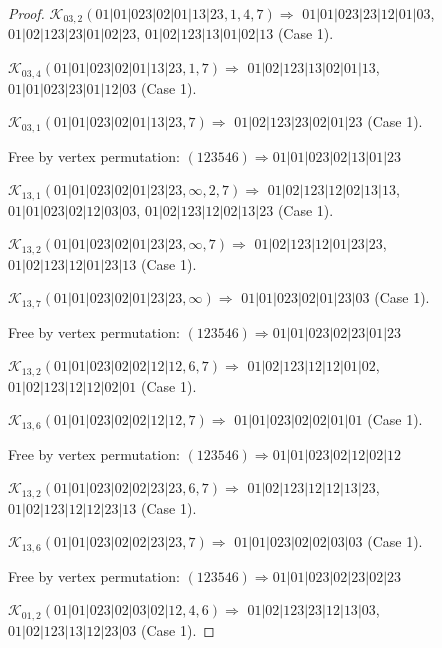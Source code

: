 \documentclass[12pt]{article}
\theoremstyle{plain}
\theoremstyle{definition}
\theoremstyle{remark}
\newcommand{\fancy}[1]{\mathcal{#1}}
\def\K{\fancy{K}}
\begin{document}
\begin{proof}
	$\K_{03,2}(01|01|023|02|01|13|23,1, 4, 7)\Rightarrow $ $01|01|023|23|12|01|03$, $01|02|123|23|01|02|23$, $01|02|123|13|01|02|13$ (Case 1).
	
	$\K_{03,4}(01|01|023|02|01|13|23,1, 7)\Rightarrow $ $01|02|123|13|02|01|13$, $01|01|023|23|01|12|03$ (Case 1).
	
	$\K_{03,1}(01|01|023|02|01|13|23,7)\Rightarrow $ $01|02|123|23|02|01|23$ (Case 1).
	
	
	
	Free by vertex permutation: $(1 2 3 5 4 6)\Rightarrow 01|01|023|02|13|01|23$
	
	
	
	\bigskip
	
	$\K_{13,1}(01|01|023|02|01|23|23,\infty,2, 7)\Rightarrow $ $01|02|123|12|02|13|13$, $01|01|023|02|12|03|03$, $01|02|123|12|02|13|23$ (Case 1).
	
	$\K_{13,2}(01|01|023|02|01|23|23,\infty,7)\Rightarrow $ $01|02|123|12|01|23|23$, $01|02|123|12|01|23|13$ (Case 1).
	
	$\K_{13,7}(01|01|023|02|01|23|23,\infty)\Rightarrow $ $01|01|023|02|01|23|03$ (Case 1).
	
	
	
	Free by vertex permutation: $(1 2 3 5 4 6)\Rightarrow 01|01|023|02|23|01|23$
	
	
	
	\bigskip
	
	$\K_{13,2}(01|01|023|02|02|12|12,6, 7)\Rightarrow $ $01|02|123|12|12|01|02$, $01|02|123|12|12|02|01$ (Case 1).
	
	$\K_{13,6}(01|01|023|02|02|12|12,7)\Rightarrow $ $01|01|023|02|02|01|01$ (Case 1).
	
	
	
	Free by vertex permutation: $(1 2 3 5 4 6)\Rightarrow 01|01|023|02|12|02|12$
	
	
	
	\bigskip
	
	$\K_{13,2}(01|01|023|02|02|23|23,6, 7)\Rightarrow $ $01|02|123|12|12|13|23$, $01|02|123|12|12|23|13$ (Case 1).
	
	$\K_{13,6}(01|01|023|02|02|23|23,7)\Rightarrow $ $01|01|023|02|02|03|03$ (Case 1).
	
	
	
	Free by vertex permutation: $(1 2 3 5 4 6)\Rightarrow 01|01|023|02|23|02|23$
	
	
	
	\bigskip
	
	$\K_{01,2}(01|01|023|02|03|02|12,4, 6)\Rightarrow $ $01|02|123|23|12|13|03$, $01|02|123|13|12|23|03$ (Case 1).
	

\end{proof}
\end{document}
